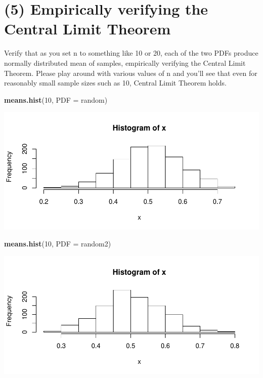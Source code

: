 \documentclass[]{article}
\newenvironment{Shaded}{\begin{snugshade}}{\end{snugshade}}
\newcommand{\KeywordTok}[1]{\textcolor[rgb]{0.13,0.29,0.53}{\textbf{{#1}}}}
\newcommand{\DataTypeTok}[1]{\textcolor[rgb]{0.13,0.29,0.53}{{#1}}}
\newcommand{\DecValTok}[1]{\textcolor[rgb]{0.00,0.00,0.81}{{#1}}}
\newcommand{\NormalTok}[1]{{#1}}
\begin{document}
\section{(5) Empirically verifying the Central Limit
Theorem}\label{empirically-verifying-the-central-limit-theorem}

Verify that as you set n to something like 10 or 20, each of the two
PDFs produce normally distributed mean of samples, empirically verifying
the Central Limit Theorem. Please play around with various values of n
and you'll see that even for reasonably small sample sizes such as 10,
Central Limit Theorem holds.

\begin{Shaded}
\begin{Highlighting}[]
\KeywordTok{means.hist}\NormalTok{(}\DecValTok{10}\NormalTok{, }\DataTypeTok{PDF =} \NormalTok{random)}
\end{Highlighting}
\end{Shaded}

\includegraphics{CHunt_Assign9_PS1_PS2_files/figure-latex/unnamed-chunk-8-1.pdf}

\begin{Shaded}
\begin{Highlighting}[]
\KeywordTok{means.hist}\NormalTok{(}\DecValTok{10}\NormalTok{, }\DataTypeTok{PDF =} \NormalTok{random2)}
\end{Highlighting}
\end{Shaded}

\includegraphics{CHunt_Assign9_PS1_PS2_files/figure-latex/unnamed-chunk-8-2.pdf}
\end{document}
